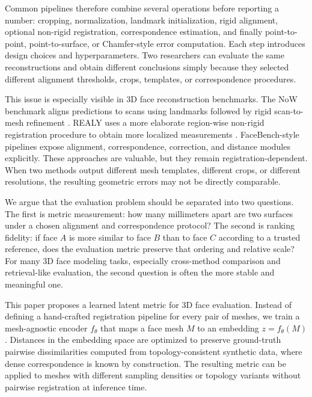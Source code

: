 \documentclass{article}
\begin{document}
Common pipelines therefore combine several operations before reporting a number: cropping, normalization, landmark initialization, rigid alignment, optional non-rigid registration, correspondence estimation, and finally point-to-point, point-to-surface, or Chamfer-style error computation. Each step introduces design choices and hyperparameters. Two researchers can evaluate the same reconstructions and obtain different conclusions simply because they selected different alignment thresholds, crops, templates, or correspondence procedures.

This issue is especially visible in 3D face reconstruction benchmarks. The NoW benchmark aligns predictions to scans using landmarks followed by rigid scan-to-mesh refinement \citep{now2018}. REALY uses a more elaborate region-wise non-rigid registration procedure to obtain more localized measurements \citep{realy2022}. FaceBench-style pipelines expose alignment, correspondence, correction, and distance modules explicitly. These approaches are valuable, but they remain registration-dependent. When two methods output different mesh templates, different crops, or different resolutions, the resulting geometric errors may not be directly comparable.

We argue that the evaluation problem should be separated into two questions. The first is metric measurement: how many millimeters apart are two surfaces under a chosen alignment and correspondence protocol? The second is ranking fidelity: if face $A$ is more similar to face $B$ than to face $C$ according to a trusted reference, does the evaluation metric preserve that ordering and relative scale? For many 3D face modeling tasks, especially cross-method comparison and retrieval-like evaluation, the second question is often the more stable and meaningful one.

This paper proposes a learned latent metric for 3D face evaluation. Instead of defining a hand-crafted registration pipeline for every pair of meshes, we train a mesh-agnostic encoder $f_\theta$ that maps a face mesh $M$ to an embedding $z=f_\theta(M)$. Distances in the embedding space are optimized to preserve ground-truth pairwise dissimilarities computed from topology-consistent synthetic data, where dense correspondence is known by construction. The resulting metric can be applied to meshes with different sampling densities or topology variants without pairwise registration at inference time.
\end{document}
